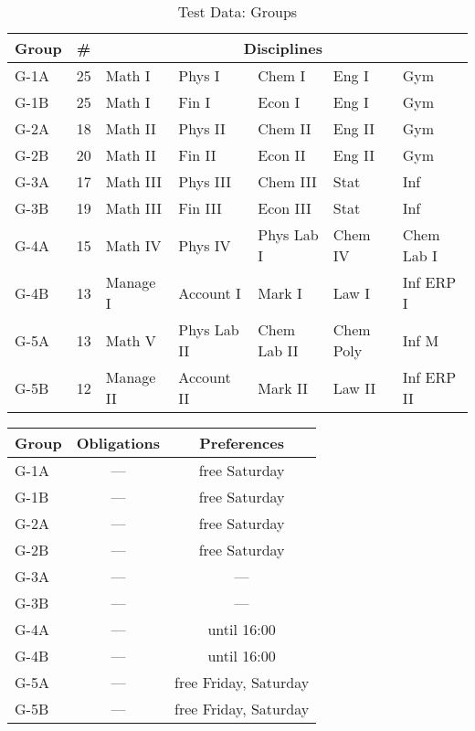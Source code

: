 \documentclass[../header]{subfiles}
\begin{document}
\begin{table}[H]\caption{Test Data: Groups}
\label{data:groups}
  \centering
  \begin{tabular}{lclllll}
    Group & \# & \multicolumn{5}{c}{Disciplines} \\\hline\hline
    G-1A  & 25 & Math I     & Phys I        & Chem I          & Eng I       & Gym         \\
    G-1B  & 25 & Math I     & Fin I         & Econ I          & Eng I       & Gym         \\\hline
    G-2A  & 18 & Math II    & Phys II       & Chem II         & Eng II      & Gym         \\
    G-2B  & 20 & Math II    & Fin II        & Econ II         & Eng II      & Gym         \\\hline
    G-3A  & 17 & Math III   & Phys III      & Chem III        & Stat        & Inf         \\
    G-3B  & 19 & Math III   & Fin III       & Econ III        & Stat        & Inf         \\\hline
    G-4A  & 15 & Math IV    & Phys IV       & Phys Lab I      & Chem IV     & Chem Lab I \\
    G-4B  & 13 & Manage I   & Account I     & Mark I          & Law I       & Inf ERP I   \\\hline
    G-5A  & 13 & Math V     & Phys Lab II   & Chem Lab II     & Chem Poly   & Inf M       \\
    G-5B  & 12 & Manage II  & Account II    & Mark II         & Law II      & Inf ERP II  \\\hline
  \end{tabular}
\end{table}

\begin{table}\ContinuedFloat
  \centering
  \begin{tabular}{lcc}
    Group & Obligations & Preferences \\\hline\hline
    G-1A  & ---         & free Saturday \\
    G-1B  & ---         & free Saturday \\\hline
    G-2A  & ---         & free Saturday \\
    G-2B  & ---         & free Saturday \\\hline
    G-3A  & ---         & ---         \\
    G-3B  & ---         & ---         \\\hline
    G-4A  & ---         & until 16:00 \\
    G-4B  & ---         & until 16:00 \\\hline
    G-5A  & ---         & free Friday, Saturday \\
    G-5B  & ---         & free Friday, Saturday \\\hline
  \end{tabular}
\end{table}
\end{document}
